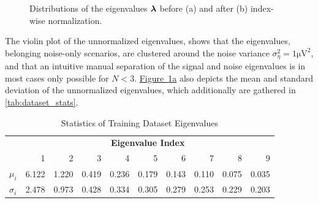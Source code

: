 \begin{figure}[H]
    \centering
    \caption{Distributions of the eigenvalues \( \boldsymbol{\lambda} \) before (a) and after (b) index-wise normalization.}
    \label{fig:eigenvalues_norm}
\end{figure}

The violin plot of the unnormalized
eigenvalues, shows that the eigenvalues, belonging noise-only scenarios, are clustered around the noise variance \( \sigma^2_{\eta} = 1\si{\micro\volt\squared}\),
and that an intuitive manual separation of the signal and noise eigenvalues is in most cases only possible for \( N < 3 \).
\hyperref[fig:eigenvalues_norm]{Figure~\ref*{fig:eigenvalues_norm}a} also depicts the mean and standard deviation of the
unnormalized eigenvalues, which additionally are gathered in \autoref{tab:dataset_stats}.

\begin{table}[H]
    \centering
    \caption{Statistics of Training Dataset Eigenvalues}
    \label{tab:dataset_stats}
    \begin{tabular}{lrrrrrrrrr}
    \toprule
    & \multicolumn{9}{c}{\textbf{Eigenvalue Index}} \\
    \cmidrule{2-10}
    & 1 & 2 & 3 & 4 & 5 & 6 & 7 & 8 & 9 \\
    \midrule
    \( \mu_i \) & 6.122 & 1.220 & 0.419 & 0.236 & 0.179 & 0.143 & 0.110 & 0.075 & 0.035 \\
    \( \sigma_i \) & 2.478 & 0.973 & 0.428 & 0.334 & 0.305 & 0.279 & 0.253 & 0.229 & 0.203 \\
    \bottomrule
    \end{tabular}
\end{table}



